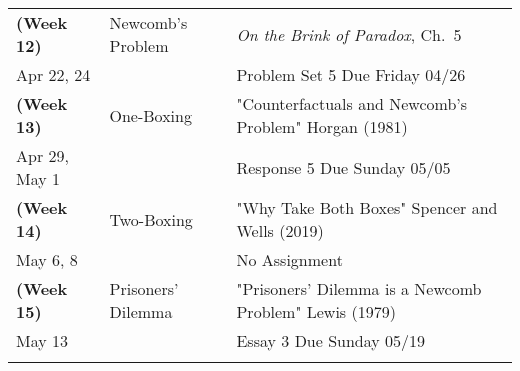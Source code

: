 \documentclass[letterpaper]{infinity_syllabus} %
\begin{document}
\begin{center}
\begin{tabularx}{\textwidth}{p{2.5cm}p{7.5cm}p{9.5cm}}
\textbf{(Week 12)} & Newcomb's Problem & \textit{On the Brink of Paradox}, Ch.~5 \\
Apr 22, 24 &  & Problem Set 5 Due Friday 04/26 \\
\arrayrulecolor{maingray}\hline
 
\textbf{(Week 13)} & One-Boxing & "Counterfactuals and Newcomb's Problem" Horgan (1981) \\
Apr 29, May 1 &  & Response 5 Due Sunday 05/05 \\
\arrayrulecolor{maingray}\hline

\textbf{(Week 14)} & Two-Boxing & "Why Take Both Boxes" Spencer and Wells (2019) \\
May 6, 8 &  & No Assignment \\
\arrayrulecolor{maingray}\hline

\textbf{(Week 15)} & Prisoners' Dilemma & "Prisoners' Dilemma is a Newcomb Problem" Lewis (1979) \\
May 13 &  & Essay 3 Due Sunday 05/19 \\
\arrayrulecolor{maingray}\hline

\end{tabularx}
\end{center}


\end{document}
